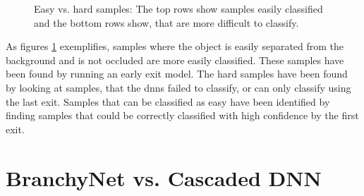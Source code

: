 \begin{figure}
	\captionsetup[subfigure]{justification=centering}
	\centering
	\hfill
	\caption[Easy vs. hard samples]{Easy vs. hard samples: The top rows show samples easily classified and the bottom rows show, that are more difficult to classify. }
	\label{fig:hardvseasy}
\end{figure}

As figures \ref{fig:hardvseasy} exemplifies, samples where the object is easily separated from the background and is not occluded are more easily classified. These samples have been found by running an early exit model. The hard samples have been found by looking at samples, that the \gls{dnn}s failed to classify, or can only classify using the last exit. Samples that can be classified as easy have been identified by finding samples that could be correctly classified with high confidence by the first exit. 

\section{BranchyNet vs. Cascaded DNN} \label{sec:ee-branchy-vs-cascaded}

